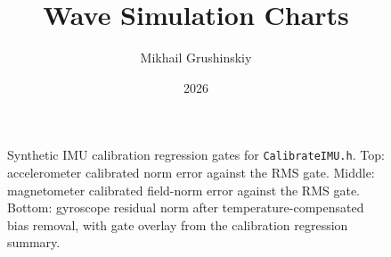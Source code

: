 \documentclass[11pt,letterpaper]{article}
\title{Wave Simulation Charts}
\author{Mikhail Grushinskiy}
\date{2026}
\begin{document}
    \maketitle



    \begin{figure}[H]\centering
    \resizebox{\textwidth}{!}{}
    \caption{Synthetic IMU calibration regression gates for \texttt{CalibrateIMU.h}. Top: accelerometer calibrated norm error against the RMS gate. Middle: magnetometer calibrated field-norm error against the RMS gate. Bottom: gyroscope residual norm after temperature-compensated bias removal, with gate overlay from the calibration regression summary.}
    \label{fig:calibrate_imu_quality}
    \end{figure}
\end{document}

